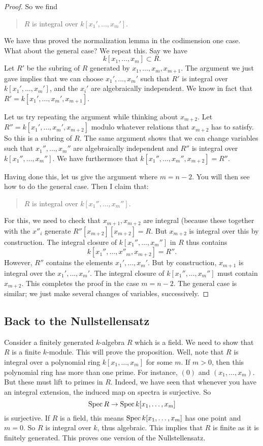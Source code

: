 \begin{proof}
So we find
\begin{quote}
$R$ is integral over $k[x_1', \dots, x_m']$.
\end{quote}

We have thus proved the normalization lemma in the codimension one case. What
about the general case? We repeat this.
Say we have
\[ k[x_1, \dots, x_m] \subset R.  \]
Let $R'$ be the subring of $R$ generated by $x_{1}, \dots,x_m, x_{m+1}$. The
argument we just gave implies that we can choose $x_1', \dots, x_m'$ such that
$R'$ is integral over $k[x_1', \dots, x_m']$, and the $x_i'$ are
algebraically independent.
We know in fact that $R' = k[x_1', \dots, x_m', x_{m+1}]$.

Let us try repeating the argument while thinking about $x_{m+2}$. Let $R'' =
k[x_1', \dots, x_m', x_{m+2}]$ modulo whatever relations that $x_{m+2}$ has to
satisfy. So this is a subring of $R$. The same argument shows that we can
change variables such that $x_1'', \dots, x_m''$ are algebraically independent
and $R''$ is integral over $k[x_1'', \dots, x_m'']$. We have furthermore that
$k[x_1'', \dots, x_m'', x_{m+2}] = R''$.

Having done this, let us give the argument where $m=n-2$. You will then see
how to do the general case. Then I claim that:
\begin{quote}
$R$ is integral over $k[x_1'', \dots, x_m'']$.
\end{quote}
For this, we need to check that $x_{m+1}, x_{m+2}$ are integral (because these
together with the $x''_i$ generate $R''[x_{m+2}][x_{m+2}]=R$.
But $x_{m+2}$ is integral over this by construction. The integral closure of
$k[x_1'', \dots, x_{m}'']$ in $R$ thus contains
\[ k[x_1'', \dots, x''_m, x_{m+2}] = R''.  \]
However, $R''$ contains the elements $x_1', \dots, x_m'$. But by construction,
$x_{m+1}$ is integral over the $x_1', \dots, x_m'$. The integral closure of
$k[x_1'', \dots, x_{m}'']$ must contain $x_{m+2}$. This completes the proof in
the case $m=n-2$. The general case is similar; we just make several changes of
variables, successively.

\end{proof}
\subsection{Back to the Nullstellensatz}

Consider a finitely generated $k$-algebra $R$ which is a field. We need to
show that $R$ is a
finite $k$-module. This will prove the proposition.
Well, note that $R$ is integral over a polynomial ring $k[x_1, \dots, x_m]$ for
some $m$.
If $m > 0$, then this polynomial ring has more than one prime.
For instance, $(0)$ and $(x_1, \dots, x_m)$. But these must lift to primes in
$R$. Indeed, we have seen that whenever you have an integral extension, the
induced map on spectra is surjective. So
\[ \operatorname{Spec} R \to \operatorname{Spec} k[x_1, \dots, x_m]  \]
is surjective. If $R$ is a field, this means $\operatorname{Spec} k[x_1, \dots, x_m]$ has one
point and $m=0$. So $R$ is integral over $k$, thus algebraic. This implies that
$R$ is finite as it is finitely generated. This proves one version of the
Nullstellensatz.


